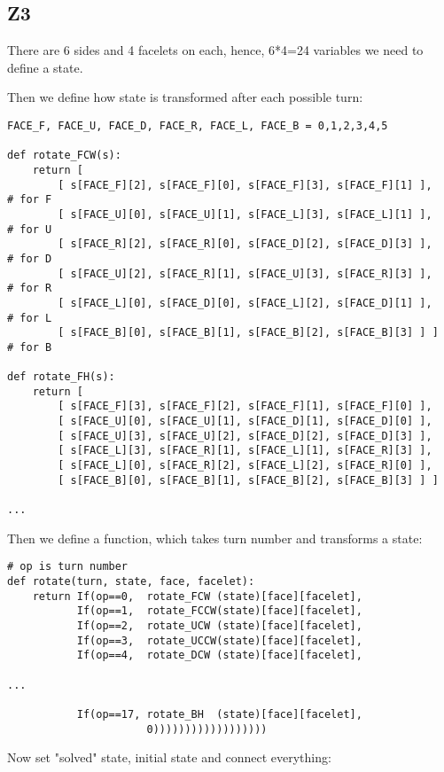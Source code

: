 \subsection{Z3}

There are 6 sides and 4 facelets on each, hence, 6*4=24 variables we need to define a state.

Then we define how state is transformed after each possible turn:

\begin{lstlisting}
FACE_F, FACE_U, FACE_D, FACE_R, FACE_L, FACE_B = 0,1,2,3,4,5

def rotate_FCW(s):
    return [
        [ s[FACE_F][2], s[FACE_F][0], s[FACE_F][3], s[FACE_F][1] ],   # for F
        [ s[FACE_U][0], s[FACE_U][1], s[FACE_L][3], s[FACE_L][1] ],   # for U
        [ s[FACE_R][2], s[FACE_R][0], s[FACE_D][2], s[FACE_D][3] ],   # for D
        [ s[FACE_U][2], s[FACE_R][1], s[FACE_U][3], s[FACE_R][3] ],   # for R
        [ s[FACE_L][0], s[FACE_D][0], s[FACE_L][2], s[FACE_D][1] ],   # for L
        [ s[FACE_B][0], s[FACE_B][1], s[FACE_B][2], s[FACE_B][3] ] ]  # for B

def rotate_FH(s):
    return [
        [ s[FACE_F][3], s[FACE_F][2], s[FACE_F][1], s[FACE_F][0] ],
        [ s[FACE_U][0], s[FACE_U][1], s[FACE_D][1], s[FACE_D][0] ],
        [ s[FACE_U][3], s[FACE_U][2], s[FACE_D][2], s[FACE_D][3] ],
        [ s[FACE_L][3], s[FACE_R][1], s[FACE_L][1], s[FACE_R][3] ],
        [ s[FACE_L][0], s[FACE_R][2], s[FACE_L][2], s[FACE_R][0] ],
        [ s[FACE_B][0], s[FACE_B][1], s[FACE_B][2], s[FACE_B][3] ] ]

...
\end{lstlisting}

Then we define a function, which takes turn number and transforms a state:

\begin{lstlisting}
# op is turn number
def rotate(turn, state, face, facelet):
    return If(op==0,  rotate_FCW (state)[face][facelet],
           If(op==1,  rotate_FCCW(state)[face][facelet],
           If(op==2,  rotate_UCW (state)[face][facelet],
           If(op==3,  rotate_UCCW(state)[face][facelet],
           If(op==4,  rotate_DCW (state)[face][facelet],

...

           If(op==17, rotate_BH  (state)[face][facelet],
                      0))))))))))))))))))
\end{lstlisting}

Now set "solved" state, initial state and connect everything:

